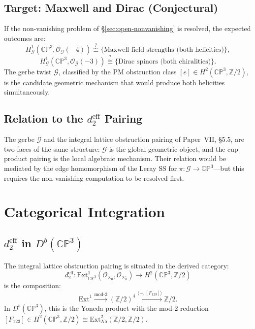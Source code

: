\documentclass[11pt,a4paper]{article}
\theoremstyle{remark}
\newcommand{\CP}{\mathbb{CP}}
\newcommand{\Z}{\mathbb{Z}}
\newcommand{\cO}{\mathcal{O}}
\newcommand{\cG}{\mathcal{G}}
\begin{document}
\subsection{Target: Maxwell and Dirac (Conjectural)}

If the non-vanishing problem of \S\ref{sec:open-nonvanishing} is resolved,
the expected outcomes are:
\[
H^1_{\cG}(\CP^3, \cO_{\cG}(-4)) \stackrel{?}{\cong}
  \{ \text{Maxwell field strengths (both helicities)} \},
\]
\[
H^1_{\cG}(\CP^3, \cO_{\cG}(-3)) \stackrel{?}{\cong}
  \{ \text{Dirac spinors (both chiralities)} \}.
\]
The gerbe twist $\cG$, classified by the PM obstruction class
$[e] \in H^2(\CP^3, \Z/2)$, is the candidate geometric mechanism that
would produce both helicities simultaneously.

\subsection{Relation to the $d_2^{\text{eff}}$ Pairing}

The gerbe $\cG$ and the integral lattice obstruction pairing of
Paper~VII, \S5.5, are two faces of the same structure: $\cG$ is the
global geometric object, and the cup product pairing is the local
algebraic mechanism. Their relation would be mediated by the edge
homomorphism of the Leray SS for $\pi: \cG \to \CP^3$---but this requires
the non-vanishing computation to be resolved first.

\section{Categorical Integration}
\label{sec:categorical}

\subsection{$d_2^{\text{eff}}$ in $D^b(\CP^3)$}

The integral lattice obstruction pairing is situated in the derived
category:
\[
d_2^{\text{eff}}: \text{Ext}^1_{\CP^3}(\cO_{\Sigma_0}, \cO_{\Sigma_0})
  \to H^2(\CP^3, \Z/2)
\]
is the composition:
\[
\text{Ext}^1 \xrightarrow{\text{mod-2}} (\Z/2)^4
  \xrightarrow{\langle -, [F_{123}] \rangle} \Z/2.
\]
In $D^b(\CP^3)$, this is the Yoneda product with the mod-2 reduction
$[F_{123}] \in H^2(\CP^3, \Z/2) \cong \mathrm{Ext}^2_{\mathrm{Ab}}(\Z/2, \Z/2)$.
\end{document}
